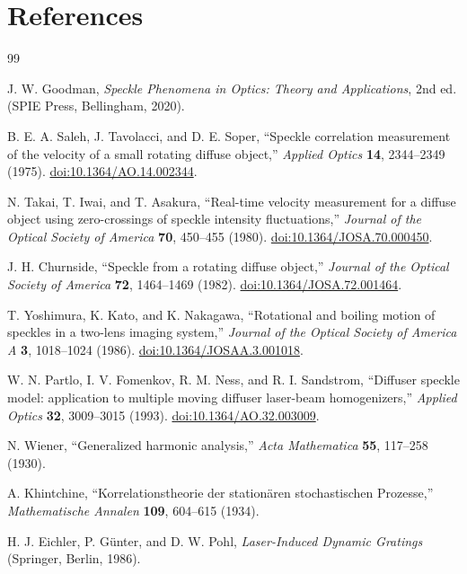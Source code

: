 \documentclass[11pt,letterpaper]{article}
\begin{document}
\section{References}

\begin{thebibliography}{99}

J. W. Goodman,
\textit{Speckle Phenomena in Optics: Theory and Applications},
2nd ed. (SPIE Press, Bellingham, 2020).

B. E. A. Saleh, J. Tavolacci, and D. E. Soper,
``Speckle correlation measurement of the velocity of a small rotating
diffuse object,''
\textit{Applied Optics} \textbf{14}, 2344--2349 (1975).
\href{https://doi.org/10.1364/AO.14.002344}
{doi:10.1364/AO.14.002344}.

N. Takai, T. Iwai, and T. Asakura,
``Real-time velocity measurement for a diffuse object using
zero-crossings of speckle intensity fluctuations,''
\textit{Journal of the Optical Society of America} \textbf{70},
450--455 (1980).
\href{https://doi.org/10.1364/JOSA.70.000450}
{doi:10.1364/JOSA.70.000450}.

J. H. Churnside,
``Speckle from a rotating diffuse object,''
\textit{Journal of the Optical Society of America} \textbf{72},
1464--1469 (1982).
\href{https://doi.org/10.1364/JOSA.72.001464}
{doi:10.1364/JOSA.72.001464}.

T. Yoshimura, K. Kato, and K. Nakagawa,
``Rotational and boiling motion of speckles in a two-lens imaging
system,''
\textit{Journal of the Optical Society of America A} \textbf{3},
1018--1024 (1986).
\href{https://doi.org/10.1364/JOSAA.3.001018}
{doi:10.1364/JOSAA.3.001018}.

W. N. Partlo, I. V. Fomenkov, R. M. Ness, and R. I. Sandstrom,
``Diffuser speckle model: application to multiple moving diffuser
laser-beam homogenizers,''
\textit{Applied Optics} \textbf{32}, 3009--3015 (1993).
\href{https://doi.org/10.1364/AO.32.003009}
{doi:10.1364/AO.32.003009}.

N. Wiener,
``Generalized harmonic analysis,''
\textit{Acta Mathematica} \textbf{55}, 117--258 (1930).

A. Khintchine,
``Korrelationstheorie der station\"aren stochastischen Prozesse,''
\textit{Mathematische Annalen} \textbf{109}, 604--615 (1934).

H. J. Eichler, P. G\"unter, and D. W. Pohl,
\textit{Laser-Induced Dynamic Gratings}
(Springer, Berlin, 1986).


\end{thebibliography}
\end{document}
